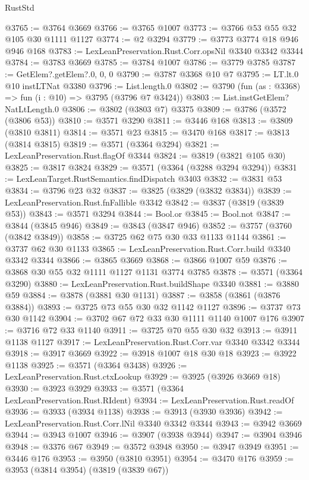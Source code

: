 \begin{lexlean}{RustStd}
\begin{coremodule}
{\begin{coremodule}
{{{{{{{{{{{{{{{{{{{{{{{{{{{{{{{@3765 := @3764 @3669
@3766 := @3765 @1007
@3773 := @3766 @53 @55 @32 @105 @30 @1111 @1127
@3774 := @2 @3294
@3779 := @3773 @3774 @18 @946 @946 @168
@3783 := LexLeanPreservation.Rust.Corr.opsNil @3340 @3342 @3344
@3784 := @3783 @3669
@3785 := @3784 @1007
@3786 := @3779 @3785
@3787 := GetElem?.getElem?.{0, 0, 0}
@3790 := @3787 @3368 @10 @7
@3795 := LT.lt.{0} @10 instLTNat @3380
@3796 := List.length.{0}
@3802 := @3790 (fun (as : @3368) => fun (i : @10) => @3795 (@3796 @7 @3424))
@3803 := List.instGetElem?NatLtLength.{0}
@3806 := @3802 (@3803 @7) @3375
@3809 := @3786 (@3572 (@3806 @53))
@3810 := @3571 @3290
@3811 := @3446 @168
@3813 := @3809 (@3810 @3811)
@3814 := @3571 @23
@3815 := @3470 @168
@3817 := @3813 (@3814 @3815)
@3819 := @3571 (@3364 @3294)
@3821 := LexLeanPreservation.Rust.flagOf @3344
@3824 := @3819 (@3821 @105 @30)
@3825 := @3817 @3824
@3829 := @3571 (@3364 (@3288 @3294 @3294))
@3831 := LexLeanTarget.RustSemantics.findDispatch @3403
@3832 := @3831 @53
@3834 := @3796 @23 @32
@3837 := @3825 (@3829 (@3832 @3834))
@3839 := LexLeanPreservation.Rust.fnFallible @3342
@3842 := @3837 (@3819 (@3839 @53))
@3843 := @3571 @3294
@3844 := Bool.or
@3845 := Bool.not
@3847 := @3844 (@3845 @946)
@3849 := @3843 (@3847 @946)
@3852 := @3757 (@3760 (@3842 @3849))
@3858 := @3725 @62 @75 @30 @33 @1133 @1144
@3861 := @3737 @62 @30 @1133
@3865 := LexLeanPreservation.Rust.Corr.build @3340 @3342 @3344
@3866 := @3865 @3669
@3868 := @3866 @1007 @59
@3876 := @3868 @30 @55 @32 @1111 @1127 @1131 @3774 @3785
@3878 := @3571 (@3364 @3290)
@3880 := LexLeanPreservation.Rust.buildShape @3340
@3881 := @3880 @59
@3884 := @3878 (@3881 @30 @1131)
@3887 := @3858 (@3861 (@3876 @3884))
@3893 := @3725 @73 @55 @30 @32 @1142 @1127
@3896 := @3737 @73 @30 @1142
@3904 := @3702 @67 @72 @33 @30 @1111 @1140 @1007 @176
@3907 := @3716 @72 @33 @1140
@3911 := @3725 @70 @55 @30 @32
@3913 := @3911 @1138 @1127
@3917 := LexLeanPreservation.Rust.Corr.var @3340 @3342 @3344
@3918 := @3917 @3669
@3922 := @3918 @1007 @18 @30 @18
@3923 := @3922 @1138
@3925 := @3571 (@3364 @3438)
@3926 := LexLeanPreservation.Rust.ctxLookup
@3929 := @3925 (@3926 @3669 @18)
@3930 := @3923 @3929
@3933 := @3571 (@3364 LexLeanPreservation.Rust.RIdent)
@3934 := LexLeanPreservation.Rust.readOf
@3936 := @3933 (@3934 @1138)
@3938 := @3913 (@3930 @3936)
@3942 := LexLeanPreservation.Rust.Corr.lNil @3340 @3342 @3344
@3943 := @3942 @3669
@3944 := @3943 @1007
@3946 := @3907 (@3938 @3944)
@3947 := @3904 @3946
@3948 := @3376 @67
@3949 := @3572 @3948
@3950 := @3947 @3949
@3951 := @3446 @176
@3953 := @3950 (@3810 @3951)
@3954 := @3470 @176
@3959 := @3953 (@3814 @3954) (@3819 (@3839 @67))
}}}}}}}}}}}}}}}}}}}}}}}}}}}}}}}
\end{coremodule}}
\end{coremodule}
\end{lexlean}
